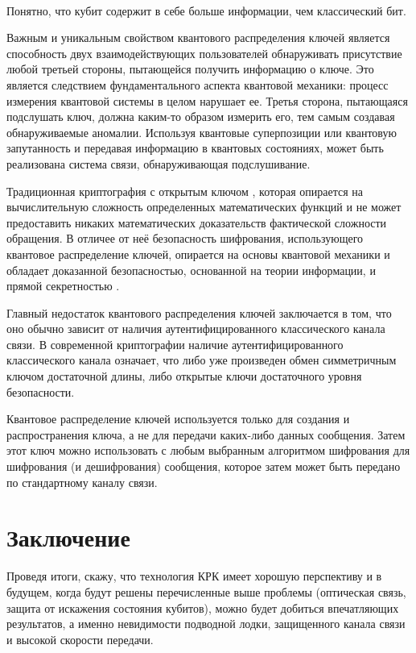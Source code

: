\documentclass[a4paper,12pt]{article} %
\begin{document}
~\\

Понятно, что кубит содержит в себе больше информации, чем классический бит.

Важным и уникальным свойством квантового распределения ключей является способность двух взаимодействующих пользователей обнаруживать присутствие любой третьей стороны, пытающейся получить информацию о ключе. Это является следствием фундаментального аспекта квантовой механики: процесс измерения квантовой системы в целом нарушает ее. Третья сторона, пытающаяся подслушать ключ, должна каким-то образом измерить его, тем самым создавая обнаруживаемые аномалии. Используя квантовые суперпозиции или квантовую запутанность и передавая информацию в квантовых состояниях, может быть реализована система связи, обнаруживающая подслушивание. 	

Традиционная криптография с открытым ключом , которая опирается на вычислительную сложность определенных математических функций и не может предоставить никаких математических доказательств фактической сложности обращения. В отличее от неё безопасность шифрования, использующего квантовое распределение ключей, опирается на основы квантовой механики и обладает доказанной безопасностью, основанной на теории информации, и прямой секретностью .

Главный недостаток квантового распределения ключей заключается в том, что оно обычно зависит от наличия аутентифицированного классического канала связи. В современной криптографии наличие аутентифицированного классического канала означает, что либо уже произведен обмен симметричным ключом достаточной длины, либо открытые ключи достаточного уровня безопасности. 

Квантовое распределение ключей используется только для создания и распространения ключа, а не для передачи каких-либо данных сообщения. Затем этот ключ можно использовать с любым выбранным алгоритмом шифрования для шифрования (и дешифрования) сообщения, которое затем может быть передано по стандартному каналу связи.

\section*{Заключение}

\hspace{13pt} Проведя итоги, скажу, что технология КРК имеет хорошую перспективу и в будущем, когда будут решены перечисленные выше проблемы (оптическая связь, защита от искажения состояния кубитов), можно будет добиться впечатляющих результатов, а именно невидимости подводной лодки, защищенного канала связи и высокой скорости передачи.
\end{document}
